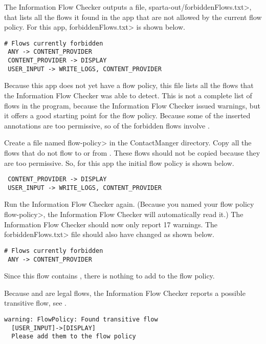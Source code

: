 The Information Flow Checker outputs a file, \<sparta-out/forbiddenFlows.txt>, that lists all the flows
 it found in the app that are not allowed by the current flow policy.  For this app, 
 \<forbiddenFlows.txt> is shown below. 

\begin{Verbatim} 
# Flows currently forbidden
 ANY -> CONTENT_PROVIDER
 CONTENT_PROVIDER -> DISPLAY
 USER_INPUT -> WRITE_LOGS, CONTENT_PROVIDER
\end{Verbatim} 
Because this app does not yet have a flow policy, this file lists all the flows that the 
Information Flow Checker was able to detect.  This is not a complete list of flows in the program,
because the Information Flow Checker issued warnings, but it offers a good starting point 
for the flow policy.  Because some of the inserted annotations are too permissive, so of the forbidden
flows involve .  

Create a file named \<flow-policy> in the ContactManger directory.  Copy all the flows that   
do not flow to or from .  These flows should not be copied because 
they are too permissive.  So, for this app the initial flow policy is shown below.
\begin{Verbatim} 
 CONTENT_PROVIDER -> DISPLAY
 USER_INPUT -> WRITE_LOGS, CONTENT_PROVIDER
\end{Verbatim}

 Run the Information Flow Checker again.  (Because you named your flow policy 
\<flow-policy>, the Information Flow Checker will automatically read it.)  The Information Flow Checker should
now only report 17 warnings.  The \<forbiddenFlows.txt> file should also have changed as shown
below.

\begin{Verbatim}
# Flows currently forbidden
 ANY -> CONTENT_PROVIDER
\end{Verbatim}
 
 Since this flow contains , there is nothing to add 
 to the flow policy.  
 
Because  and  are legal flows,
  the Information Flow Checker reports a possible transitive flow,  see \secref{}. 
 
\begin{Verbatim}
warning: FlowPolicy: Found transitive flow
  [USER_INPUT]->[DISPLAY]
  Please add them to the flow policy
\end{Verbatim} 

